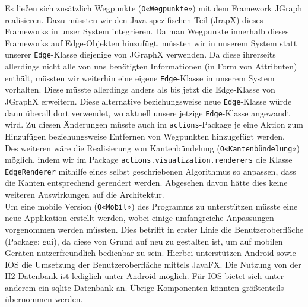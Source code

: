\documentclass[enabledeprecatedfontcommands,fontsize=11pt,paper=a4,twoside]{scrartcl}
\newcounter{one}
\begin{document}
Es ließen sich zusätzlich Wegpunkte (\texttt{O«Wegpunkte»}) mit dem Framework JGraph realisieren. Dazu müssten wir den Java-spezifischen Teil (JrapX) dieses Frameworks in unser System integrieren. Da man Wegpunkte innerhalb dieses Frameworks auf Edge-Objekten hinzufügt, müssten wir in unserem System statt unserer \texttt{Edge}-Klasse diejenige von JGraphX verwenden. Da diese ihrerseits allerdings nicht alle von uns benötigten Informationen (in Form von Attributen) enthält, müssten wir weiterhin eine eigene \texttt{Edge}-Klasse in unserem System vorhalten. Diese müsste allerdings anders als bis jetzt die Edge-Klasse von JGraphX erweitern. Diese alternative beziehungsweise neue \texttt{Edge}-Klasse würde dann überall dort verwendet, wo aktuell unsere jetzige \texttt{Edge}-Klasse angewandt wird. Zu diesen Änderungen müsste auch im \texttt{actions}-Package je eine Aktion zum Hinzufügen beziehungsweise Entfernen von Wegpunkten hinzugefügt werden. \\

Des weiteren wäre die Realisierung von Kantenbündelung (\texttt{O«Kantenbündelung»}) möglich, indem wir im Package \texttt{actions.visualization.renderers} die Klasse \texttt{EdgeRenderer} mithilfe eines selbst geschriebenen Algorithmus so anpassen, dass die Kanten entsprechend gerendert werden. Abgesehen davon hätte dies keine weiteren Auswirkungen auf die Architektur.  \\

Um eine mobile Version (\texttt{O«Mobil»}) des Programms zu unterstützen müsste eine neue Applikation erstellt werden, wobei einige umfangreiche Anpassungen vorgenommen werden müssten. Dies betrifft in erster Linie die Benutzeroberfläche (Package: gui), da diese von Grund auf neu zu gestalten ist, um auf mobilen Geräten nutzerfreundlich bedienbar zu sein. Hierbei unterstützen Android sowie IOS die Umsetzung der Benutzeroberfläche mittels JavaFX. Die Nutzung von der H2 Datenbank ist lediglich unter Android möglich. Für IOS bietet sich unter anderem ein sqlite-Datenbank an. Übrige Komponenten könnten größtenteils übernommen werden. 
\end{document}
